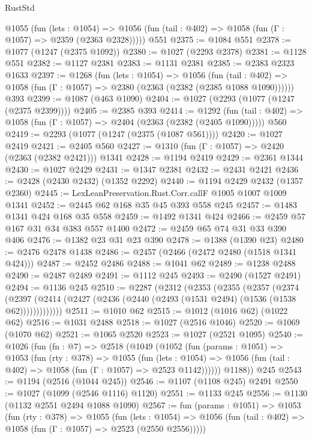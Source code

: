 \begin{lexlean}{RustStd}
\begin{coremodule}
    @1055
      (fun (lets : @1054) =>
      @1056 (fun (tail : @402) => @1058 (fun (Γ : @1057) => @2359 (@2363 @2328)))))
    @551
@2375 := @1084 @551
@2378 := @1077 (@1247 (@2375 @1092))
@2380 := @1027 (@2293 @2378)
@2381 := @1128 @551
@2382 := @1127 @2381
@2383 := @1131 @2381
@2385 := @2383 @2323 @1633
@2397 := @1268
    (fun (lets : @1054) =>
    @1056
      (fun (tail : @402) => @1058 (fun (Γ : @1057) => @2380 (@2363 (@2382 (@2385 @1088 @1090))))))
    @393
@2399 := @1087 (@463 @1090)
@2404 := @1027 (@2293 (@1077 (@1247 (@2375 @2399))))
@2405 := @2385 @393
@2414 := @1292
    (fun (tail : @402) => @1058 (fun (Γ : @1057) => @2404 (@2363 (@2382 (@2405 @1090)))))
    @560
@2419 := @2293 (@1077 (@1247 (@2375 (@1087 @561))))
@2420 := @1027 @2419
@2421 := @2405 @560
@2427 := @1310 (fun (Γ : @1057) => @2420 (@2363 (@2382 @2421))) @1341
@2428 := @1194 @2419
@2429 := @2361 @1344
@2430 := @1027 @2429
@2431 := @1347 @2381
@2432 := @2431 @2421
@2436 := @2428 (@2430 @2432) (@1352 @2292)
@2440 := @1194 @2429 @2432 (@1357 @2360)
@2445 := LexLeanPreservation.Rust.Corr.callF @1005 @1007 @1009 @1341
@2452 := @2445 @62 @168 @35 @45 @393 @558 @245
@2457 := @1483 @1341 @424 @168 @35 @558
@2459 := @1492 @1341 @424
@2466 := @2459 @57 @167 @31 @34 @383 @557 @1400
@2472 := @2459 @65 @74 @31 @33 @390 @406
@2476 := @1382 @23 @31 @23 @390
@2478 := @1388 (@1390 @23)
@2480 := @2476 @2478 @1438
@2486 := @2457 (@2466 (@2472 @2480 (@1518 @1341 @424)))
@2487 := @2452 @2486
@2488 := @1041 @62
@2489 := @1238 @2488
@2490 := @2487 @2489
@2491 := @1112 @245
@2493 := @2490 (@1527 @2491)
@2494 := @1136 @245
@2510 := @2287
    (@2312
      (@2353
        (@2355
          (@2357
            (@2374
              (@2397 (@2414 (@2427 (@2436 (@2440 (@2493 (@1531 @2494) (@1536 (@1538 @62)))))))))))))
@2511 := @1010 @62
@2515 := @1012 (@1016 @62) (@1022 @62)
@2516 := @1031 @2488
@2518 := @1027 (@2516 @1046)
@2520 := @1069 (@1070 @62)
@2521 := @1065 @2520
@2523 := @1027 (@2521 @1095)
@2540 := @1026
    (fun (fn : @7) =>
    @2518
      (@1049
        (@1052
          (fun (params : @1051) =>
          @1053
            (fun (rty : @378) =>
            @1055
              (fun (lets : @1054) =>
              @1056 (fun (tail : @402) => @1058 (fun (Γ : @1057) => @2523 @1142))))))
        @1188))
    @245
@2543 := @1194 (@2516 (@1044 @245))
@2546 := @1107 (@1108 @245) @2491
@2550 := @1027 (@1099 (@2546 @1116) @1120)
@2551 := @1133 @245
@2556 := @1130 (@1132 @2551 @2494 @1088 @1090)
@2567 := fun (params : @1051) =>
  @1053
    (fun (rty : @378) =>
    @1055
      (fun (lets : @1054) =>
      @1056 (fun (tail : @402) => @1058 (fun (Γ : @1057) => @2523 (@2550 @2556)))))

\end{coremodule}
\end{lexlean}
